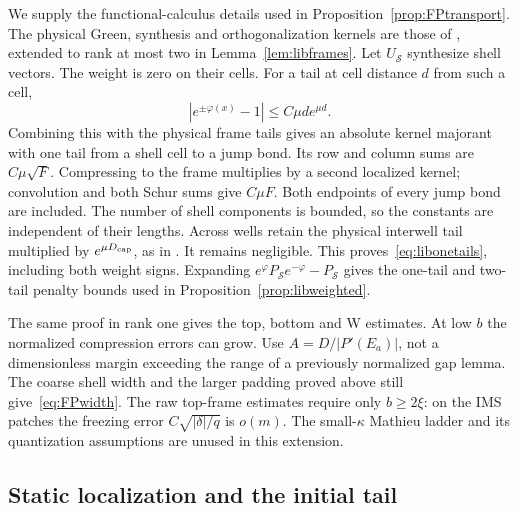 We supply the functional-calculus details used in
Proposition~\ref{prop:FPtransport}.
The physical Green, synthesis and orthogonalization kernels are
those of \cite[Appendices B--D]{DMband}, extended to rank at most two
in Lemma~\ref{lem:libframes}. Let $U_{\mathcal S}$ synthesize shell
vectors. The weight is zero on their cells. For a tail at cell
distance $d$ from such a cell,
\[
 |e^{\pm\varphi(x)}-1|\le C\mu d e^{\mu d}.
\]
Combining this with the physical frame tails gives an absolute
kernel majorant with one tail from a shell cell to a jump bond.
Its row and column sums are $C\mu\sqrt F$.
Compressing to the frame multiplies by a second localized kernel;
convolution and both Schur sums give $C\mu F$.
Both endpoints of every jump bond are included. The number of
shell components is bounded, so the constants are independent of
their lengths. Across wells retain the physical interwell tail
multiplied by $e^{\mu D_{\rm cap}}$, as in
\cite[Appendix D, Boundary leakage with the correct rate]{DMband}.
It remains negligible. This proves~\eqref{eq:libonetails}, including
both weight signs. Expanding
$e^\varphi P_{\mathcal S}e^{-\varphi}-P_{\mathcal S}$ gives the
one-tail and two-tail penalty bounds used in
Proposition~\ref{prop:libweighted}.

The same proof in rank one gives the top, bottom and W estimates.
At low $b$ the normalized compression errors can grow.
Use $A=D/|P'(E_a)|$, not a dimensionless margin exceeding the
range of a previously normalized gap lemma. The coarse shell width
and the larger padding proved above still give~\eqref{eq:FPwidth}.
The raw top-frame estimates require only $b\ge2\xi$: on the IMS
patches the freezing error $C\sqrt{|\delta|/q}$ is $o(m)$.
The small-$\kappa$ Mathieu ladder and its quantization assumptions
are unused in this extension.

\subsection{Static localization and the initial tail}

